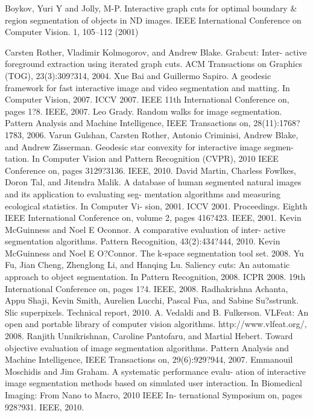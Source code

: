\documentclass[runningheads,a4paper]{llncs}
\begin{document}
%
%

\begin{thebibliography}{12}

 Boykov, Yuri Y and Jolly, M-P. Interactive graph cuts for optimal boundary \& region segmentation of objects in ND images. IEEE International Conference on Computer Vision. 1, 105--112 (2001)

 Carsten Rother, Vladimir Kolmogorov, and Andrew Blake. Grabcut: Inter-
active foreground extraction using iterated graph cuts. ACM Transactions
on Graphics (TOG), 23(3):309?314, 2004.
 Xue Bai and Guillermo Sapiro. A geodesic framework for fast interactive image and video segmentation and matting. In Computer Vision, 2007. ICCV 2007. IEEE 11th International Conference on, pages 1?8. IEEE, 2007.
 Leo Grady. Random walks for image segmentation. Pattern Analysis and Machine Intelligence, IEEE Transactions on, 28(11):1768?1783, 2006.
 Varun Gulshan, Carsten Rother, Antonio Criminisi, Andrew Blake, and Andrew Zisserman. Geodesic star convexity for interactive image segmen- tation. In Computer Vision and Pattern Recognition (CVPR), 2010 IEEE Conference on, pages 3129?3136. IEEE, 2010.
 David Martin, Charless Fowlkes, Doron Tal, and Jitendra Malik. A database of human segmented natural images and its application to evaluating seg- mentation algorithms and measuring ecological statistics. In Computer Vi- sion, 2001. ICCV 2001. Proceedings. Eighth IEEE International Conference on, volume 2, pages 416?423. IEEE, 2001.
 Kevin McGuinness and Noel E Oconnor. A comparative evaluation of inter- active segmentation algorithms. Pattern Recognition, 43(2):434?444, 2010.
 Kevin McGuinness and Noel E O?Connor. The k-space segmentation tool set. 2008.
 Yu Fu, Jian Cheng, Zhenglong Li, and Hanqing Lu. Saliency cuts: An automatic approach to object segmentation. In Pattern Recognition, 2008. ICPR 2008. 19th International Conference on, pages 1?4. IEEE, 2008.
 Radhakrishna Achanta, Appu Shaji, Kevin Smith, Aurelien Lucchi, Pascal Fua, and Sabine Su?sstrunk. Slic superpixels. Technical report, 2010.
 A. Vedaldi and B. Fulkerson. VLFeat: An open and portable library of
computer vision algorithms. http://www.vlfeat.org/, 2008.
 Ranjith Unnikrishnan, Caroline Pantofaru, and Martial Hebert. Toward
objective evaluation of image segmentation algorithms. Pattern Analysis
and Machine Intelligence, IEEE Transactions on, 29(6):929?944, 2007.
Emmanouil Moschidis and Jim Graham. A systematic performance evalu-
ation of interactive image segmentation methods based on simulated user interaction. In Biomedical Imaging: From Nano to Macro, 2010 IEEE In- ternational Symposium on, pages 928?931. IEEE, 2010.
\end{thebibliography}
\end{document}
